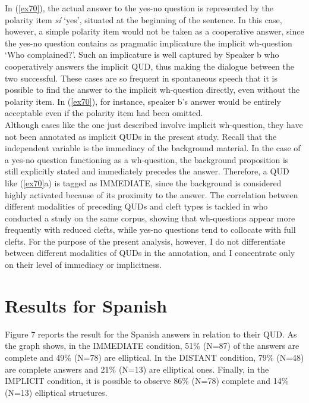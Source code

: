 In (\ref{ex70}), the actual answer to the yes-no question is represented by the polarity item \textit{sí} `yes', situated at the beginning of the sentence. In this case, however, a simple polarity item would not be taken as a cooperative answer, since the yes-no question contains as pragmatic implicature \parencite{grice1975logic} the implicit wh-question `Who complained?'. Such an implicature is well captured by Speaker b who cooperatively answers the implicit QUD, thus making the dialogue between the two successful. These cases are so frequent in spontaneous speech that it is possible to find the answer to the implicit wh-question directly, even without the polarity item. In (\ref{ex70}), for instance, speaker b's answer would be entirely acceptable even if the polarity item had been omitted.\\
Although cases like the one just described involve implicit wh-question, they have not been annotated as implicit QUDs in the present study. Recall that the independent variable is the immediacy of the background material. In the case of a yes-no question functioning as a wh-question, the background proposition is still explicitly stated and immediately precedes the answer. Therefore, a QUD like (\ref{ex70}a) is tagged as {\selectfont IMMEDIATE}, since the background is considered highly activated because of its proximity to the answer. The correlation between different modalities of preceding QUDs and cleft types is tackled in \textcite{cassara2022clefts} who conducted a study on the same corpus, showing that wh-questions appear more frequently with reduced clefts, while yes-no questions tend to collocate with full clefts. For the purpose of the present analysis, however, I do not differentiate between different modalities of QUDs in the annotation, and I concentrate only on their level of immediacy or implicitness.

\section{Results for Spanish}
Figure 7 reports the result for the Spanish answers in relation to their QUD. As the graph shows, in the {\selectfont IMMEDIATE} condition, 51\% (N=87) of the answers are complete and 49\% (N=78) are elliptical. In the {\selectfont DISTANT} condition, 79\% (N=48) are complete answers and 21\% (N=13) are elliptical ones. Finally, in the {\selectfont IMPLICIT} condition, it is possible to observe 86\% (N=78) complete and 14\% (N=13) elliptical structures.\\

